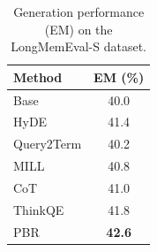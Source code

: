\begin{table}[htbp]
\centering
\caption{Generation performance (EM) on the LongMemEval-S dataset.}
\begin{tabular}{lc}
\toprule
\textbf{Method} & \textbf{EM (\%)} \\
\midrule
Base & 40.0 \\
HyDE & 41.4 \\
Query2Term & 40.2 \\
MILL & 40.8 \\
CoT & 41.0 \\
ThinkQE & 41.8 \\
PBR & \textbf{42.6} \\
\bottomrule
\end{tabular}
\label{tab:gen_em}
\end{table}




